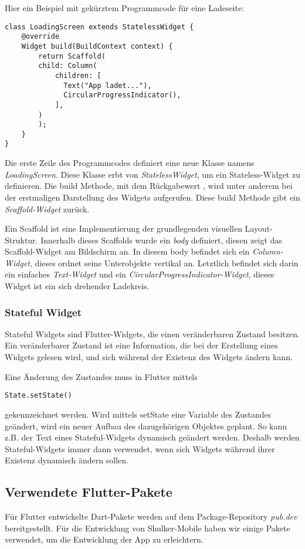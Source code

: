 Hier ein Beispiel mit gekürztem Programmcode für eine Ladeseite:
\begin{lstlisting}
class LoadingScreen extends StatelessWidget {
    @override
    Widget build(BuildContext context) {
        return Scaffold(
        child: Column(
            children: [
              Text("App ladet..."),
              CircularProgressIndicator(),
            ],
        )
        );
    }
}
\end{lstlisting}

Die erste Zeile des Programmcodes definiert eine neue Klasse namens \textit{LoadingScreen}.
Diese Klasse erbt von \textit{StatelessWidget}, um ein Stateless-Widget zu definieren.
Die build Methode, mit dem Rückgabewert , wird unter anderem bei der erstmaligen
Darstellung des Widgets aufgerufen. \cite{flutterstatelesswidgets}
Diese build Methode gibt ein \textit{Scaffold-Widget} zurück.

Ein Scaffold ist eine Implementierung der grundlegenden visuellen Layout-Struktur. 
Innerhalb dieses Scaffolds wurde ein \textit{body} definiert, diesen zeigt das Scaffold-Widget am Bildschirm an.
In diesem body befindet sich ein \textit{Column-Widget}, dieses ordnet seine Unterobjekte vertikal an.
Letztlich befindet sich darin ein einfaches \textit{Text-Widget} und ein \textit{CircularProgressIndicator-Widget}, 
dieses Widget ist ein sich drehender Ladekreis. 

\subsubsection{Stateful Widget}
Stateful Widgets sind Flutter-Widgets, die einen veränderbaren Zustand besitzen.
Ein veränderbarer Zustand ist eine Information, die bei der Erstellung eines Widgets
gelesen wird, und sich während der Existenz des Widgets ändern kann.


Eine Änderung des Zustandes muss in Flutter mittels 
\begin{lstlisting}
State.setState()
\end{lstlisting} gekennzeichnet werden. Wird mittels setState eine Variable des Zustandes geändert,
wird ein neuer Aufbau des dazugehörigen Objektes geplant. So kann z.B. der Text eines Stateful-Widgets 
dynamisch geändert werden. Deshalb werden Stateful-Widgets immer dann verwendet, wenn sich Widgets während 
ihrer Existenz dynamisch ändern sollen. 

\subsection{Verwendete Flutter-Pakete}
Für Flutter entwickelte Dart-Pakete werden auf dem Package-Repository \textit{pub.dev} bereitgestellt.
Für die Entwicklung von Shulker-Mobile haben wir einige Pakete verwendet, um die Entwicklung der App zu
erleichtern.

